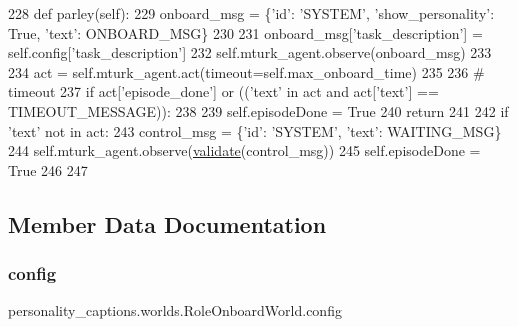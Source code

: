 \begin{DoxyCode}
228     \textcolor{keyword}{def }parley(self):
229         onboard\_msg = \{\textcolor{stringliteral}{'id'}: \textcolor{stringliteral}{'SYSTEM'}, \textcolor{stringliteral}{'show\_personality'}: \textcolor{keyword}{True}, \textcolor{stringliteral}{'text'}: ONBOARD\_MSG\}
230 
231         onboard\_msg[\textcolor{stringliteral}{'task\_description'}] = self.config[\textcolor{stringliteral}{'task\_description'}]
232         self.mturk\_agent.observe(onboard\_msg)
233 
234         act = self.mturk\_agent.act(timeout=self.max\_onboard\_time)
235 
236         \textcolor{comment}{# timeout}
237         \textcolor{keywordflow}{if} act[\textcolor{stringliteral}{'episode\_done'}] \textcolor{keywordflow}{or} ((\textcolor{stringliteral}{'text'} \textcolor{keywordflow}{in} act \textcolor{keywordflow}{and} act[\textcolor{stringliteral}{'text'}] == TIMEOUT\_MESSAGE)):
238 
239             self.episodeDone = \textcolor{keyword}{True}
240             \textcolor{keywordflow}{return}
241 
242         \textcolor{keywordflow}{if} \textcolor{stringliteral}{'text'} \textcolor{keywordflow}{not} \textcolor{keywordflow}{in} act:
243             control\_msg = \{\textcolor{stringliteral}{'id'}: \textcolor{stringliteral}{'SYSTEM'}, \textcolor{stringliteral}{'text'}: WAITING\_MSG\}
244             self.mturk\_agent.observe(\hyperlink{namespaceparlai_1_1core_1_1worlds_afc3fad603b7bce41dbdc9cdc04a9c794}{validate}(control\_msg))
245             self.episodeDone = \textcolor{keyword}{True}
246 
247 
\end{DoxyCode}


\subsection{Member Data Documentation}
\mbox{\label{classpersonality__captions_1_1worlds_1_1RoleOnboardWorld_ade4545af6ba49e704c8df5d223c330f0}} 
\subsubsection{\texorpdfstring{config}{config}}
{\footnotesize\ttfamily personality\+\_\+captions.\+worlds.\+Role\+Onboard\+World.\+config}



